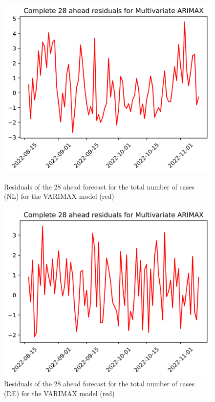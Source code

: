 \begin{figure}

\begin{minipage}{.45\textwidth}
  \centering
  \includegraphics[width=\linewidth]{pics/28_ah/28_ahead_errors_Multivariate ARIMAX.png}
  \caption{Residuals of the 28 ahead forecast for the total number of cases (NL) for the VARIMAX model (red)}
  \label{fig:tot_cases_error_28_VARIMAX}
\end{minipage}
\begin{minipage}{.45\textwidth}
  \centering
  \includegraphics[width=\linewidth]{pics/28_ah/DE_28_ahead_errors_Multivariate ARIMAX.png}
  \caption{Residuals of the 28 ahead forecast for the total number of cases (DE) for the VARIMAX model (red)}
  \label{fig:tot_cases_error_28_VARIMAX_DE}
\end{minipage}

\end{figure}

